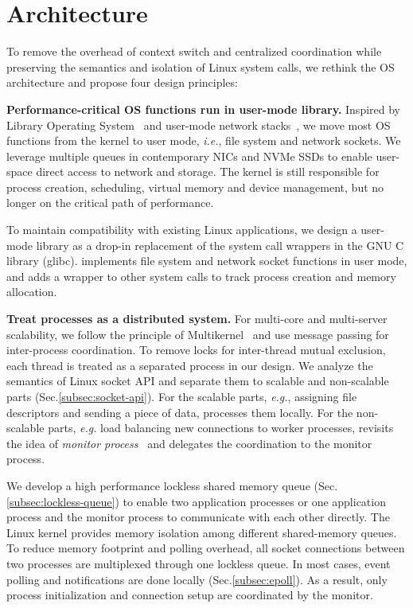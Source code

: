 \section{Architecture}
\label{sec:architecture}

To remove the overhead of context switch and centralized coordination while preserving the semantics and isolation of Linux system calls, we rethink the OS architecture and propose four design principles:

\textbf{Performance-critical OS functions run in user-mode library.}
Inspired by Library Operating System~ and user-mode network stacks~, we move most OS functions from the kernel to user mode, \textit{i.e.}, file system and network sockets. We leverage multiple queues in contemporary NICs and NVMe SSDs to enable user-space direct access to network and storage. The kernel is still responsible for process creation, scheduling, virtual memory and device management, but no longer on the critical path of performance.

To maintain compatibility with existing Linux applications, we design a user-mode library \libipc as a drop-in replacement of the system call wrappers in the GNU C library (glibc). \libipc implements file system and network socket functions in user mode, and adds a wrapper to other system calls to track process creation and memory allocation.

\textbf{Treat processes as a distributed system.}
For multi-core and multi-server scalability, we follow the principle of Multikernel~\cite{baumann2009multikernel} and use message passing for inter-process coordination. To remove locks for inter-thread mutual exclusion, each thread is treated as a separated process in our design. We analyze the semantics of Linux socket API and separate them to scalable and non-scalable parts (Sec.\ref{subsec:socket-api}). For the scalable parts, \textit{e.g.}, assigning file descriptors and sending a piece of data, \libipc processes them locally. For the non-scalable parts, \textit{e.g.} load balancing new connections to worker processes, \libipc revisits the idea of \textit{monitor process}~ and delegates the coordination to the monitor process.

We develop a high performance lockless shared memory queue (Sec.\ref{subsec:lockless-queue}) to enable two application processes or one application process and the monitor process to communicate with each other directly. The Linux kernel provides memory isolation among different shared-memory queues. To reduce memory footprint and polling overhead, all socket connections between two processes are multiplexed through one lockless queue. In most cases, event polling and notifications are done locally (Sec.\ref{subsec:epoll}). As a result, only process initialization and connection setup are coordinated by the monitor.

